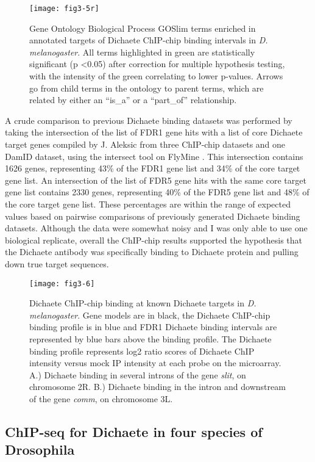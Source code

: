 \begin{figure}
\centering
\texttt{[image: fig3-5r]}
\caption{Gene Ontology Biological Process GOSlim terms enriched in annotated targets of Dichaete ChIP-chip binding intervals in \emph{D. melanogaster}. All terms highlighted in green are statistically significant (p \textless 0.05) after correction for multiple hypothesis testing, with the intensity of the green correlating to lower p-values. Arrows go from child terms in the ontology to parent terms, which are related by either an “is\_a” or a “part\_of” relationship.}
\label{Figure 3.5}
\end{figure}

A crude comparison to previous Dichaete binding datasets was performed by taking the intersection of the list of FDR1 gene hits with a list of core Dichaete target genes compiled by J. Aleksic from three ChIP-chip datasets and one DamID dataset, using the intersect tool on FlyMine \citep{aleksic_role_2013,lyne_flymine:_2007}. This intersection contains 1626 genes, representing 43\% of the FDR1 gene list and 34\% of the core target gene list. An intersection of the list of FDR5 gene hits with the same core target gene list contains 2330 genes, representing 40\% of the FDR5 gene list and 48\% of the core target gene list. These percentages are within the range of expected values based on pairwise comparisons of previously generated Dichaete binding datasets. Although the data were somewhat noisy and I was only able to use one biological replicate, overall the ChIP-chip results supported the hypothesis that the Dichaete antibody was specifically binding to Dichaete protein and pulling down true target sequences.

\begin{figure}
\centering
\texttt{[image: fig3-6]}
\caption{Dichaete ChIP-chip binding at known Dichaete targets in \emph{D. melanogaster}. Gene models are in black, the Dichaete ChIP-chip binding profile is in blue and FDR1 Dichaete binding intervals are represented by blue bars above the binding profile. The Dichaete binding profile represents log2 ratio scores of Dichaete ChIP intensity versus mock IP intensity at each probe on the microarray. A.) Dichaete binding in several introns of the gene \emph{slit}, on chromosome 2R. B.) Dichaete binding in the intron and downstream of the gene \emph{comm}, on chromosome 3L.}
\label{Figure 3.6}
\end{figure}

\subsection{ChIP-seq for Dichaete in four species of Drosophila}
